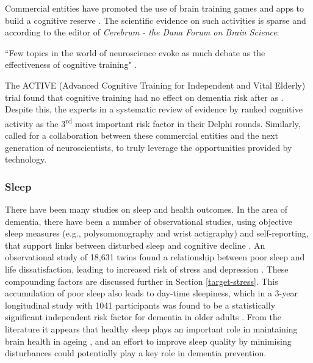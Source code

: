 Commercial entities have promoted the use of brain training games and apps to build a cognitive reserve \cite{Worland}. The scientific evidence on such activities is sparse and according to the editor of \textit{Cerebrum - the Dana Forum on Brain Science}:
\begin{displayquote}
``Few topics in the world of neuroscience evoke as much debate as the effectiveness of cognitive training" \cite{Boot2014}.
\end{displayquote}
The ACTIVE (Advanced Cognitive Training for Independent and Vital Elderly) trial found that cognitive training had no effect on dementia risk after as \cite{Unverzagt2012}. Despite this, the experts in a systematic review of evidence by \citeauthor{Deckers2015} ranked cognitive activity as the 3\textsuperscript{rd} most important risk factor in their Delphi rounds. Similarly, \cite{Bavelier2013} called for a collaboration between these commercial entities and the next generation of neuroscientists, to truly leverage the opportunities provided by technology.

\subsubsection{Sleep}
There have been many studies on sleep and health outcomes. In the area of dementia, there have been a number of observational studies, using objective sleep measures (e.g., polysomonography and wrist actigraphy) and self-reporting, that support links between disturbed sleep and cognitive decline \cite{Spira2014}. An observational study of 18,631 twins found a relationship between poor sleep and life dissatisfaction, leading to increased risk of stress and depression \cite{Paunio2009}. These compounding factors are discussed further in Section \ref{target-stress}. This accumulation of poor sleep also leads to day-time sleepiness, which in a 3-year longitudinal study with 1041 participants was found to be a statistically significant independent risk factor for dementia in older adults \cite{Tsapanou2015}.
From the literature it appears that healthy sleep plays an important role in maintaining brain health in ageing \cite{Spira2014}, and an effort to improve sleep quality by minimising disturbances could potentially play a key role in dementia prevention.

